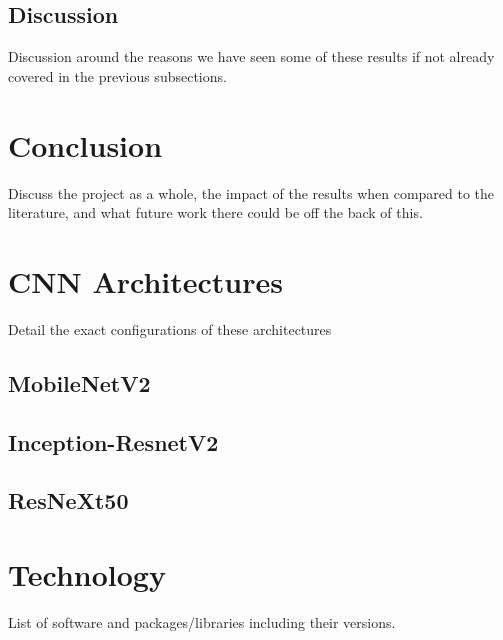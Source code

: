 \documentclass[12pt]{article}
\numberwithin{equation}{section}
\numberwithin{figure}{section}
\begin{document}
\subsection{Discussion} 
\label{sub:Discussion} 
Discussion around the reasons we have seen some of these results if not already covered in the previous subsections. 

\section{Conclusion} 
\label{sec:Conclusion} 
Discuss the project as a whole, the impact of the results when compared to the literature, and what future work there could be off the back of this.




 

\appendix

\section{CNN Architectures} 
\label{sec:CNN_Architectures} 
Detail the exact configurations of these architectures
\subsection{MobileNetV2} 
\label{sub:MobileNetV2} 
 
\subsection{Inception-ResnetV2} 
\label{sub:Inception-ResnetV2} 
 
\subsection{ResNeXt50} 
\label{sub:ResNeXt50} 
 

\section{Technology} 
\label{sec:Technology} 
List of software and packages/libraries including their versions.
\end{document}
